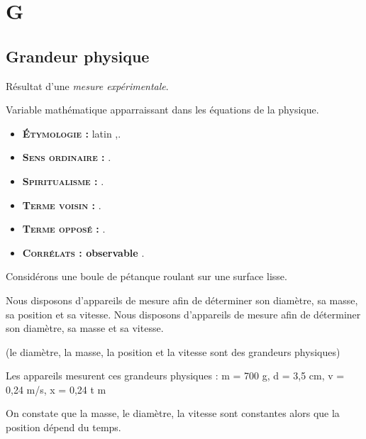 \chapter{G}
\section{Grandeur physique}

Résultat d'une {\it mesure expérimentale}.

Variable mathématique apparraissant dans les équations de la physique.

{\footnotesize
\begin{itemize}[leftmargin=1cm, label=, itemsep=1pt]
\item {\bf \textsc{Étymologie} :} latin {\it },.
\item {\bf \textsc{Sens ordinaire} :} .
\item {\bf \textsc{Spiritualisme} :} .
\end{itemize}

\begin{itemize}[leftmargin=1cm, label=, itemsep=1pt]
\item {\bf \textsc{Terme voisin} :} .
\item {\bf \textsc{Terme opposé} :} .
\item {\bf \textsc{Corrélats} : observable} .
\end{itemize}
}

Considérons une boule de pétanque roulant sur une surface lisse.

Nous disposons d'appareils de mesure afin de déterminer son diamètre, sa masse, sa position et sa vitesse.
Nous disposons d'appareils de mesure afin de déterminer son diamètre, sa masse et sa vitesse.

(le diamètre, la masse, la position et la vitesse sont des grandeurs physiques)

Les appareils mesurent ces grandeurs physiques : m = 700 g, d = 3,5 cm, v = 0,24 m/s, x = 0,24 t m

On constate que la masse, le diamètre, la vitesse sont constantes alors que la position dépend du temps.
